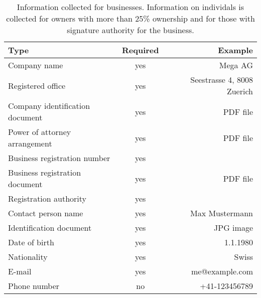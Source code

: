 \begin{table}
  \caption{Information collected for businesses. Information on individals is
    collected for owners with more than 25\% ownership and for those with
    signature authority for the business.}
  \label{table:proc:kyb:business}
  \begin{center}
    \begin{tabular}{l|c|r}
      {\bf Type}                      & {\bf Required} & {\bf Example}        \\ \hline \hline
      Company name                    & yes        & Mega AG \\
      Registered office               & yes        & Seestrasse 4, 8008 Zuerich \\
      Company identification document & yes        & PDF file \\
      Power of attorney arrangement   & yes        & PDF file  \\
      Business registration number    & yes        &  \\
      Business registration document  & yes        & PDF file \\
      Registration authority          & yes        &  \\ \hline
      Contact person name             & yes        & Max Mustermann \\
      Identification document         & yes        & JPG image \\
      Date of birth                   & yes        & 1.1.1980  \\
      Nationality                     & yes        & Swiss     \\
      E-mail                          & yes        & me@example.com \\
      Phone number                    & no         & +41-123456789  \\
  \end{tabular}
  \end{center}
\end{table}
